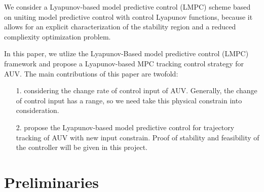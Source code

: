 \documentclass[journal,11pt,draftcls,onecolumn]{IEEEtran}
\begin{document}
We consider a Lyapunov-based model predictive control (LMPC) scheme based on uniting model predictive control with control Lyapunov functions, because it allows for an explicit characterization of the stability region and a reduced compliexity optimization problem.

In this paper, we utlize the Lyapunov-Based model predictive control (LMPC) framework\cite{mhaskar2006stabilization,de2008lyapunov} and propose a Lyapunov-based MPC tracking control strategy for AUV. The main contributions of this paper are twofold:
\begin{itemize}
\item[1.] considering the change rate of control input of AUV. Generally, the change of control input has a range, so we need take this physical constrain into consideration.
\item[2.] propose the Lyapunov-based model predictive control for trajectory tracking of AUV with new input constrain. Proof of stability and feasibility of the controller will be given in this project.
\end{itemize}
\section{Preliminaries}
\end{document}
